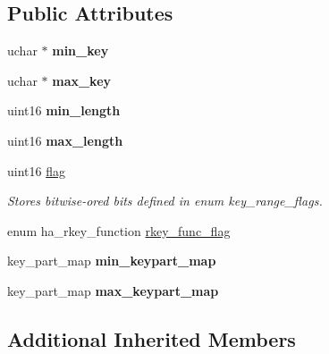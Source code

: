 \subsection*{Public Attributes}
\begin{DoxyCompactItemize}
\item 
\mbox{\label{classQUICK__RANGE_a8f6088b7c4db73d24d5a95ca71ae2d09}} 
uchar $\ast$ {\bfseries min\+\_\+key}
\item 
\mbox{\label{classQUICK__RANGE_af46ee9e5655144080bc1ed0f5eb5e413}} 
uchar $\ast$ {\bfseries max\+\_\+key}
\item 
\mbox{\label{classQUICK__RANGE_a483ec33f63d7b6d4c04c3a9066fe8677}} 
uint16 {\bfseries min\+\_\+length}
\item 
\mbox{\label{classQUICK__RANGE_a625cf65979cbb0c0fbe79ba3ecda8787}} 
uint16 {\bfseries max\+\_\+length}
\item 
\mbox{\label{classQUICK__RANGE_a39543bbe7cc029525206b572c0c1e88f}} 
uint16 \mbox{\hyperlink{classQUICK__RANGE_a39543bbe7cc029525206b572c0c1e88f}{flag}}
\begin{DoxyCompactList}\small\item\em Stores bitwise-\/or\textquotesingle{}ed bits defined in enum key\+\_\+range\+\_\+flags. \end{DoxyCompactList}\item 
enum ha\+\_\+rkey\+\_\+function \mbox{\hyperlink{classQUICK__RANGE_aff9fa5a812d1fe709a9aea62a3c83662}{rkey\+\_\+func\+\_\+flag}}
\item 
\mbox{\label{classQUICK__RANGE_a96f2199b4ba6d117aa664b91261664f4}} 
key\+\_\+part\+\_\+map {\bfseries min\+\_\+keypart\+\_\+map}
\item 
\mbox{\label{classQUICK__RANGE_ae1e96acaedd2184d6cc50116ad8c0fff}} 
key\+\_\+part\+\_\+map {\bfseries max\+\_\+keypart\+\_\+map}
\end{DoxyCompactItemize}
\subsection*{Additional Inherited Members}


